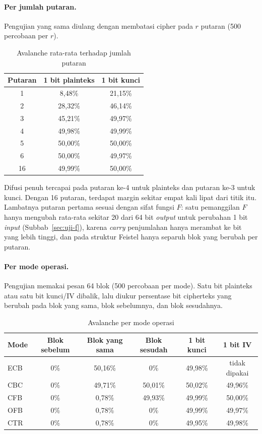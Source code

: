 \paragraph{Per jumlah putaran.} Pengujian yang sama diulang dengan membatasi cipher pada $r$
putaran (500 percobaan per $r$).

\begin{table}[H]
  \centering
  \caption{Avalanche rata-rata terhadap jumlah putaran}
  \begin{tabular}{ccc}
    \toprule
    Putaran & 1 bit plainteks & 1 bit kunci \\
    \midrule
    1 & 8,48\% & 21,15\% \\
    2 & 28,32\% & 46,14\% \\
    3 & 45,21\% & 49,97\% \\
    4 & 49,98\% & 49,99\% \\
    5 & 50,00\% & 50,00\% \\
    6 & 50,00\% & 49,97\% \\
    16 & 49,99\% & 50,00\% \\
    \bottomrule
  \end{tabular}
\end{table}

Difusi penuh tercapai pada putaran ke-4 untuk plainteks dan putaran ke-3 untuk kunci. Dengan 16
putaran, terdapat margin sekitar empat kali lipat dari titik itu. Lambatnya putaran pertama sesuai
dengan sifat fungsi $F$: satu pemanggilan $F$ hanya mengubah rata-rata sekitar 20 dari 64 bit
\textit{output} untuk perubahan 1 bit \textit{input} (Subbab~\ref{sec:uji-f}), karena \textit{carry}
penjumlahan hanya merambat ke bit yang lebih tinggi, dan pada struktur Feistel hanya separuh
blok yang berubah per putaran.

\paragraph{Per mode operasi.} Pengujian memakai pesan 64 blok (500 percobaan per mode).
Satu bit plainteks atau satu bit kunci/IV dibalik, lalu diukur persentase bit cipherteks yang
berubah pada blok yang sama, blok sebelumnya, dan blok sesudahnya.

\begin{table}[H]
  \centering
  \caption{Avalanche per mode operasi}
  \begin{tabular}{lccccc}
    \toprule
    Mode & Blok sebelum & Blok yang sama & Blok sesudah & 1 bit kunci & 1 bit IV \\
    \midrule
    ECB & 0\% & 50,16\% & 0\% & 49,98\% & tidak dipakai \\
    CBC & 0\% & 49,71\% & 50,01\% & 50,02\% & 49,96\% \\
    CFB & 0\% & 0,78\% & 49,93\% & 49,99\% & 50,00\% \\
    OFB & 0\% & 0,78\% & 0\% & 49,99\% & 49,97\% \\
    CTR & 0\% & 0,78\% & 0\% & 49,95\% & 49,98\% \\
    \bottomrule
  \end{tabular}
\end{table}

